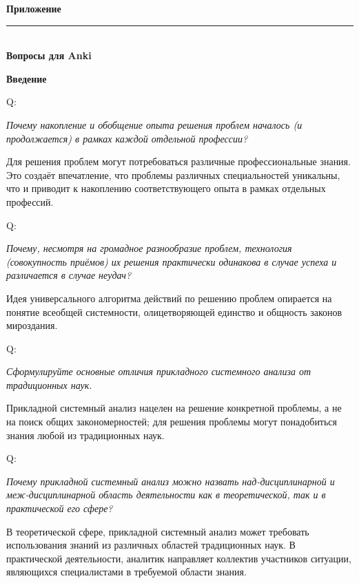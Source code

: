 \documentclass{article}
\renewcommand{\section}[2]{
	\vspace{6em}
	\begin{flushright}
	\Large
	\baselineskip=0.5\baselineskip
	\textbf{#1}
	\\
	\rule[0.5\baselineskip]{\textwidth}{0.15pt}
	\\
	\textbf{#2}
	\end{flushright}
	}
\renewcommand{\subsection}[1]{
	\vspace{2em}
	\begin{flushright}
		\large
		\textbf{#1}
	\end{flushright}
	}
\newcommand{\question}[2]{
	\begin{flushright}
		Q:\hspace{2ex}\vline\hspace{2ex}
		\begin{minipage}{0.9\textwidth}
			\large
			\textit{#1}
		\end{minipage}
	\end{flushright}
	\begin{center}
		\begin{minipage}{0.95\textwidth}
			#2
		\end{minipage}
	\end{center}
	}
\begin{document}
\newpage
\section{Приложение}{Вопросы для Anki}
\subsection{Введение}
\question{Почему накопление и обобщение опыта решения проблем началось (и продолжается) в рамках каждой отдельной профессии?}{Для решения проблем могут потребоваться различные профессиональные знания. Это создаёт впечатление, что проблемы различных специальностей уникальны, что и приводит к накоплению соответствующего опыта в рамках отдельных профессий.}
\question{Почему, несмотря на громадное разнообразие проблем, технология (совокупность приёмов) их решения практически одинакова в случае успеха и различается в случае неудач?}{Идея универсального алгоритма действий по решению проблем опирается на понятие всеобщей системности, олицетворяющей единство и общность законов мироздания.}
\question{Сформулируйте основные отличия прикладного системного анализа от традиционных наук.}{Прикладной системный анализ нацелен на решение конкретной проблемы, а не на поиск общих закономерностей; для решения проблемы могут понадобиться знания любой из традиционных наук.}
\question{Почему прикладной системный анализ можно назвать над-дисциплинарной и меж-дисциплинарной область деятельности как в теоретической, так и в практической его сфере?}{В теоретической сфере, прикладной системный анализ может требовать использования знаний из различных областей традиционных наук. В практической деятельности, аналитик направляет коллектив участников ситуации, являющихся специалистами в требуемой области знания.}
\end{document}
